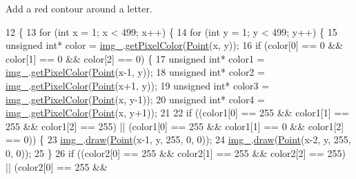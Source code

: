 Add a red contour around a letter. 


\begin{DoxyCode}
12                            \{
13     \textcolor{keywordflow}{for} (\textcolor{keywordtype}{int} x = 1; x < 499; x++) \{
14         \textcolor{keywordflow}{for} (\textcolor{keywordtype}{int} y = 1; y < 499; y++) \{
15             \textcolor{keywordtype}{unsigned} \textcolor{keywordtype}{int}* color = \mbox{\hyperlink{class_font_v1_a00569e3e3c4b70f437b63f396f735fb0}{img\_}}.\mbox{\hyperlink{class_image_adb23176701dae47479d4919f55f3aec5}{getPixelColor}}(\mbox{\hyperlink{class_point}{Point}}(x, y));
16             \textcolor{keywordflow}{if} (color[0] == 0 \&\& color[1] == 0 \&\& color[2] == 0) \{
17                 \textcolor{keywordtype}{unsigned} \textcolor{keywordtype}{int}* color1 = \mbox{\hyperlink{class_font_v1_a00569e3e3c4b70f437b63f396f735fb0}{img\_}}.\mbox{\hyperlink{class_image_adb23176701dae47479d4919f55f3aec5}{getPixelColor}}(\mbox{\hyperlink{class_point}{Point}}(x-1, y));
18                 \textcolor{keywordtype}{unsigned} \textcolor{keywordtype}{int}* color2 = \mbox{\hyperlink{class_font_v1_a00569e3e3c4b70f437b63f396f735fb0}{img\_}}.\mbox{\hyperlink{class_image_adb23176701dae47479d4919f55f3aec5}{getPixelColor}}(\mbox{\hyperlink{class_point}{Point}}(x+1, y));
19                 \textcolor{keywordtype}{unsigned} \textcolor{keywordtype}{int}* color3 = \mbox{\hyperlink{class_font_v1_a00569e3e3c4b70f437b63f396f735fb0}{img\_}}.\mbox{\hyperlink{class_image_adb23176701dae47479d4919f55f3aec5}{getPixelColor}}(\mbox{\hyperlink{class_point}{Point}}(x, y-1));
20                 \textcolor{keywordtype}{unsigned} \textcolor{keywordtype}{int}* color4 = \mbox{\hyperlink{class_font_v1_a00569e3e3c4b70f437b63f396f735fb0}{img\_}}.\mbox{\hyperlink{class_image_adb23176701dae47479d4919f55f3aec5}{getPixelColor}}(\mbox{\hyperlink{class_point}{Point}}(x, y+1));
21 
22                 \textcolor{keywordflow}{if} ((color1[0] == 255 \&\& color1[1] == 255 \&\& color1[2] == 255) || (color1[0] == 255 \&\& 
      color1[1] == 0 \&\& color1[2] == 0)) \{
23                     \mbox{\hyperlink{class_font_v1_a00569e3e3c4b70f437b63f396f735fb0}{img\_}}.\mbox{\hyperlink{class_image_a8d162f3cab956131d58708c09aa560b0}{draw}}(\mbox{\hyperlink{class_point}{Point}}(x-1, y, 255, 0, 0));
24                     \mbox{\hyperlink{class_font_v1_a00569e3e3c4b70f437b63f396f735fb0}{img\_}}.\mbox{\hyperlink{class_image_a8d162f3cab956131d58708c09aa560b0}{draw}}(\mbox{\hyperlink{class_point}{Point}}(x-2, y, 255, 0, 0));
25                 \}
26                 \textcolor{keywordflow}{if} ((color2[0] == 255 \&\& color2[1] == 255 \&\& color2[2] == 255) || (color2[0] == 255 \&\& 

\end{DoxyCode}

